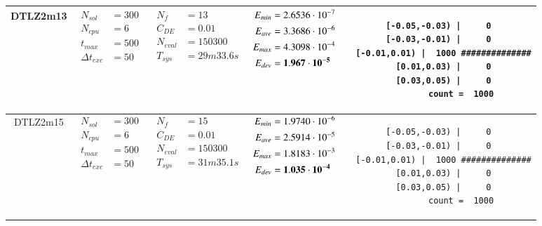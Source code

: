 \begin{table*} [!t]
\begin{tabular}[c]{ccccc}
\hline



DTLZ2m13
&
{$\!\begin{aligned}
    N_{sol}        &= 300 \\
	N_{cpu}        &= 6 \\
	t_{max}        &= 500 \\
	\Delta t_{exc} &= 50
\end{aligned}$}
&
{$\!\begin{aligned}
	N_{f}    &= 13 \\
	C_{DE}   &= 0.01 \\
	N_{eval} &= 150300 \\
	T_{sys}  &= 29m33.6s
\end{aligned}$}
&
{$\!\begin{aligned}
    E_{min} &= 2.6536\cdot 10^{-7} \\
    E_{ave} &= 3.3686\cdot 10^{-6} \\
    E_{max} &= 4.3098\cdot 10^{-4} \\
    E_{dev} &= {\bf 1.967\cdot 10^{-5}}
\end{aligned}$}
&
\begin{minipage}{4.1cm} \fontsize{5pt}{6pt}
\begin{verbatim}
 [-0.05,-0.03) |     0 
 [-0.03,-0.01) |     0 
  [-0.01,0.01) |  1000 ##############
   [0.01,0.03) |     0 
   [0.03,0.05) |     0 
         count =  1000
 \end{verbatim}
\end{minipage} \\

\hline



DTLZ2m15
&
{$\!\begin{aligned}
    N_{sol}        &= 300 \\
	N_{cpu}        &= 6 \\
	t_{max}        &= 500 \\
	\Delta t_{exc} &= 50
\end{aligned}$}
&
{$\!\begin{aligned}
	N_{f}    &= 15 \\
	C_{DE}   &= 0.01 \\
	N_{eval} &= 150300 \\
	T_{sys}  &= 31m35.1s
\end{aligned}$}
&
{$\!\begin{aligned}
    E_{min} &= 1.9740\cdot 10^{-6} \\
    E_{ave} &= 2.5914\cdot 10^{-5} \\
    E_{max} &= 1.8183\cdot 10^{-3} \\
    E_{dev} &= {\bf 1.035\cdot 10^{-4}}
\end{aligned}$}
&
\begin{minipage}{4.1cm} \fontsize{5pt}{6pt}
\begin{verbatim}
 [-0.05,-0.03) |     0 
 [-0.03,-0.01) |     0 
  [-0.01,0.01) |  1000 ##############
   [0.01,0.03) |     0 
   [0.03,0.05) |     0 
         count =  1000
 \end{verbatim}
\end{minipage} \\


\end{tabular}
\end{table*}
